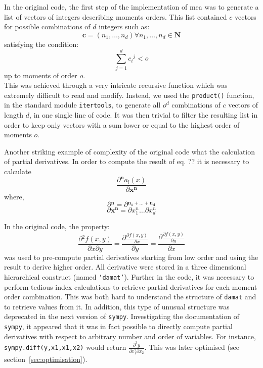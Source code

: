 \documentclass[11pt,a4paper]{article}
\newcommand{\sympy}{\texttt{sympy}}
\begin{document}
In the original code, the first step of the implementation of \acrshort{mea} was to generate a list of vectors of integers describing moments orders.
This list contained $c$ vectors for possible combinations of $d$ integers such as:\\
\[\mathbf{c} =(n_1, \dots, n_d) \forall{n_1, \dots, n_d \in \mathbf{N}}\]
satisfying the condition:\\
\[\sum_{j=1}^{d} {c_i}^j < o\]
up to moments of order $o$.\\

This was achieved through a very intricate recursive function which was extremely difficult to read and modify.
Instead, we used the \texttt{product()} function, in the standard module \texttt{itertools},
to generate all $o^d$ combinations of $c$ vectors of length  $d$, in one single line of code.
It was then trivial to filter the resulting list in order to keep only vectors with a sum lower or equal to the highest order of moments $o$.

Another striking example of complexity of the original code what the calculation of partial derivatives.
In order to compute the result of eq. ??\cite{ale_general_2013} it is necessary to calculate\\
\[\frac{\partial{}^\mathbf{n} a_l(x)}{\partial{}\mathbf{x^n}}\]
where,\\
\[\partial{}^\mathbf{n} = \partial{}^\mathbf{n_1+\dots{}+n_d}\]
\[\partial{} \mathbf{x^n} = \partial{} x^n_1 \dots{} \partial x^n_d\]

In the original code, the property:
\begin{equation}
\label{eq:partial}
\frac{\partial{} ^ 2 f(x,y)}{\partial x \partial y} =
\frac{\partial{} \frac{\partial{} f(x,y)}{\partial x}}{\partial y} =
\frac{\partial{} \frac{\partial{} f(x,y)}{\partial{} y}}{\partial{} x}
\end{equation}
was used to pre-compute partial derivatives starting from low order and using the result to derive higher order.
All derivative were stored in a three dimensional hierarchical construct (named \texttt{`damat'}).
Further in the code, it was necessary to perform  tedious index calculations to
retrieve partial derivatives for each moment order combination.
This was both hard to understand the structure of \texttt{damat} and to retrieve values from it.
In addition, this type of unusual structure was deprecated in the next version of \sympy{}.
Investigating the documentation of \sympy, it appeared that it was in fact possible to directly compute partial derivatives
with respect to arbitrary number and order of variables.
For instance, \texttt{sympy.diff(y,x1,x1,x2)} would return $\frac{\partial^3 y}{\partial x_1^2 \partial x_2}$.
This was later optimised (see section~\ref{sec:optimisation}).
\end{document}
